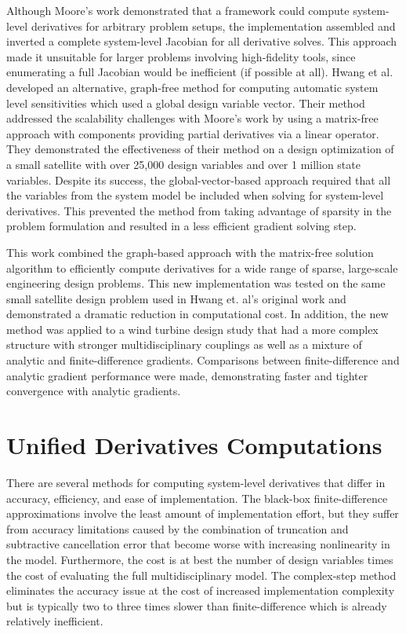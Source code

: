 \documentclass[]{aiaa-tc} %
\begin{document}
    Although Moore's work demonstrated that a framework could compute system-level derivatives for arbitrary
    problem setups, the implementation assembled and inverted a complete system-level Jacobian for 
    all derivative solves.  This approach made it unsuitable for larger problems involving 
    high-fidelity tools, since enumerating a full Jacobian would be inefficient (if possible at all).
    Hwang et al. developed an alternative, graph-free method for computing automatic system
    level sensitivities which used a global design variable vector\cite{CADRE2012}. Their method 
    addressed the scalability challenges with Moore's work by using a matrix-free approach with 
    components providing partial derivatives via a linear operator. They demonstrated the 
    effectiveness of their method on a design optimization of a small satellite
    with over 25,000 design variables and over 1 million state variables. Despite its success,
    the global-vector-based approach required that all the variables from the system model be
    included when solving for system-level derivatives. This prevented the method
    from taking advantage of sparsity in the problem formulation and resulted in a less efficient gradient solving step.

    This work combined the graph-based approach with the matrix-free solution algorithm
    to efficiently compute derivatives for a wide range of sparse, large-scale engineering
    design problems. This new implementation was tested on the same small satellite design problem used in 
    Hwang et. al's original work and demonstrated a dramatic reduction in computational cost. In addition,
    the new method was applied to a wind turbine design study that had a more 
    complex structure with stronger multidisciplinary couplings as well as a mixture of 
    analytic and finite-difference gradients. Comparisons between finite-difference and analytic gradient 
    performance were made, demonstrating faster and tighter convergence with analytic gradients. 

  \section{Unified Derivatives Computations}
  
	There are several methods for computing system-level derivatives that differ in accuracy, efficiency, and ease of implementation.
	The black-box finite-difference approximations involve the least amount of implementation effort, but they suffer from accuracy 
  limitations caused by the combination of truncation and subtractive cancellation error that become worse with increasing nonlinearity in the model.
	Furthermore, the cost is at best the number of design variables times the cost of evaluating the full multidisciplinary model.
	The complex-step method eliminates the accuracy issue at the cost of increased implementation complexity but is typically two to three times slower than finite-difference which is already relatively inefficient.
	
\end{document}
